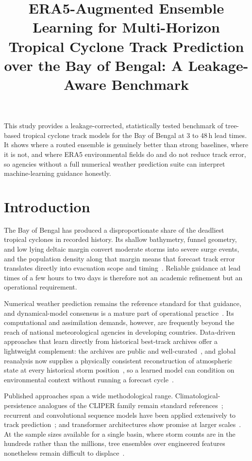 \documentclass{ametsocv6.1}
\title{ERA5-Augmented Ensemble Learning for Multi-Horizon Tropical Cyclone
Track Prediction over the Bay of Bengal: A Leakage-Aware Benchmark}
\affiliation{
\aff{a} [Department, Institution, City, Country]
}
\newcommand{\bob}{Bay of Bengal}
\begin{document}
\maketitle

\statement
This study provides a leakage-corrected, statistically tested benchmark of
tree-based tropical cyclone track models for the Bay of Bengal at 3 to 48\,h
lead times. It shows where a routed ensemble is genuinely better than strong
baselines, where it is not, and where ERA5 environmental fields do and do not
reduce track error, so agencies without a full numerical weather prediction
suite can interpret machine-learning guidance honestly.

\section{Introduction}

\label{sec:intro}
The \bob{} has produced a disproportionate share of the deadliest tropical
cyclones in recorded history. Its shallow bathymetry, funnel geometry, and low
lying deltaic margin convert moderate storms into severe surge events, and the
population density along that margin means that forecast track error translates
directly into evacuation scope and
timing~\citep{worldbank2007sidr,paul2013post,dube2009storm}. Reliable guidance at
lead times of a few hours to two days is therefore not an academic refinement but
an operational requirement.

Numerical weather prediction remains the reference standard for that guidance,
and dynamical-model consensus is a mature part of operational
practice~\citep{goerss2000tropical,goerss2004tropical}. Its computational and
assimilation demands, however, are frequently beyond the reach of national
meteorological agencies in developing countries. Data-driven approaches that
learn directly from historical best-track archives offer a lightweight
complement: the archives are public and
well-curated~\citep{knapp2010ibtracs,gahtan2024ibtracs}, and global reanalysis now
supplies a physically consistent reconstruction of atmospheric state at every
historical storm position~\citep{hersbach2023era5}, so a learned model can
condition on environmental context without running a forecast
cycle~\citep{giffard2020tropical,kumar2024machine}.

Published approaches span a wide methodological range. Climatological-persistence
analogues of the CLIPER family remain standard
references~\citep{neumann1972alternative,aberson1998five}; recurrent and
convolutional sequence models have been applied extensively to track
prediction~\citep{lian2020novel,alemany2019predicting,rahman2025tropical}; and
transformer architectures show promise at larger
scales~\citep{qu2025accurate}. At the sample sizes available for a single basin,
where storm counts are in the hundreds rather than the millions, tree ensembles
over engineered features nonetheless remain difficult to
displace~\citep{grinsztajn2022tree,ganaie2022ensemble}.
\end{document}
